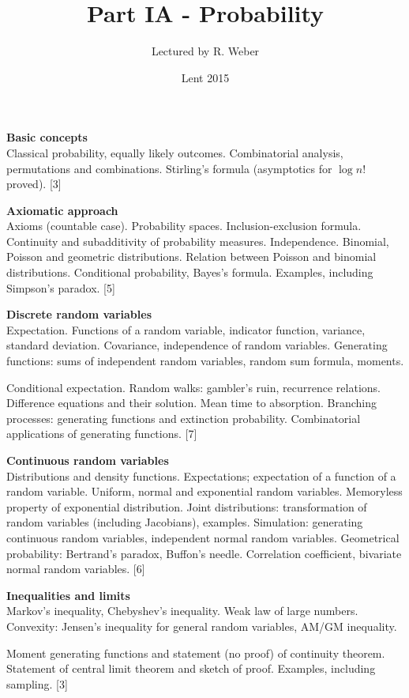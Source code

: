 \documentclass[a4paper]{article}
\title{Part IA - Probability}
\author{Lectured by R. Weber}
\date{Lent 2015}
\begin{document}
\maketitle
{\small
  \noindent\textbf{Basic concepts}\\
  Classical probability, equally likely outcomes. Combinatorial analysis, permutations and combinations.  Stirling's formula (asymptotics for $\log n!$ proved).\hspace*{\fill}  [3]
 
  \vspace{10pt}
  \noindent\textbf{Axiomatic approach}\\
  Axioms (countable case). Probability spaces. Inclusion-exclusion formula. Continuity and subadditivity of probability measures. Independence. Binomial, Poisson and geometric distributions. Relation between Poisson and binomial distributions. Conditional probability, Bayes's formula. Examples, including Simpson's paradox.\hspace*{\fill} [5]
 
  \vspace{10pt}
  \noindent\textbf{Discrete random variables}\\
  Expectation. Functions of a random variable, indicator function, variance, standard deviation. Covariance, independence of random variables. Generating functions: sums of independent random variables, random sum formula, moments.
 
  \vspace{5pt}
  \noindent Conditional expectation. Random walks: gambler's ruin, recurrence relations. Difference equations and their solution. Mean time to absorption. Branching processes: generating functions and extinction probability. Combinatorial applications of generating functions.\hspace*{\fill} [7]
 
  \vspace{10pt}
  \noindent\textbf{Continuous random variables}\\
  Distributions and density functions. Expectations; expectation of a function of a random variable.  Uniform, normal and exponential random variables. Memoryless property of exponential distribution.  Joint distributions: transformation of random variables (including Jacobians), examples. Simulation: generating continuous random variables, independent normal random variables. Geometrical probability: Bertrand's paradox, Buffon's needle. Correlation coefficient, bivariate normal random variables.\hspace*{\fill} [6]
 
  \vspace{10pt}
  \noindent\textbf{Inequalities and limits}\\
  Markov's inequality, Chebyshev's inequality. Weak law of large numbers. Convexity: Jensen's inequality for general random variables, AM/GM inequality.
 
  \vspace{5pt}
  \noindent Moment generating functions and statement (no proof) of continuity theorem. Statement of central limit theorem and sketch of proof. Examples, including sampling.\hspace*{\fill} [3]}
\end{document}
